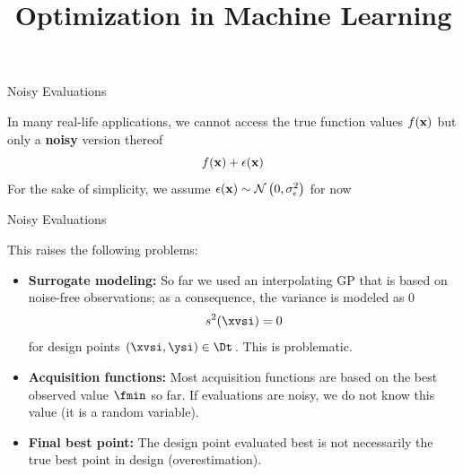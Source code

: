 \documentclass[11pt,compress,t,notes=noshow, xcolor=table]{beamer}
\title{Optimization in Machine Learning}
\date{}
\begin{document}
\lecture{\inserttitle}


\begin{frame}{Noisy Evaluations}

In many real-life applications, we cannot access the true function values $f(\mathbf{x})$ but only a \textbf{noisy} version thereof
$$f(\mathbf{x}) + \epsilon(\mathbf{x})$$
For the sake of simplicity, we assume $\epsilon(\mathbf{x}) \sim \mathcal{N}\left(0, \sigma_{\epsilon}^{2}\right)$ for now\\
\vfill
{}

\end{frame}

\begin{frame}{Noisy Evaluations} 

This raises the following problems: 

\begin{itemize}
  \item \textbf{Surrogate modeling:} So far we used an interpolating GP that is based on noise-free observations; as a consequence, the variance is modeled as $0$
  $$
    s^2(\xvsi) = 0
  $$
  for design points $(\xvsi, \ysi) \in \Dt$. This is problematic. 
  \item \textbf{Acquisition functions:} Most acquisition functions are based on the best observed value $\fmin$ so far. If evaluations are noisy, we do not know this value (it is a random variable).
  \item \textbf{Final best point:} The design point evaluated best is not necessarily the true best point in design (overestimation). 
\end{itemize}


\end{frame}
\end{document}
